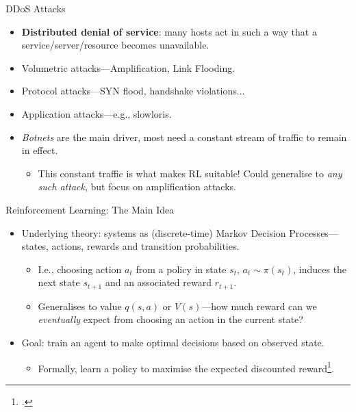 \documentclass[aspectratio=169,xcolor={dvipsnames}
,hide notes
]{beamer}
\begin{document}
\begin{frame}{DDoS Attacks}
\begin{itemize}
	\item \textbf{Distributed denial of service}: many hosts act in such a way that a service/server/resource becomes unavailable.
	\item \alert{Volumetric} attacks---Amplification, Link Flooding.
	\item \alert{Protocol} attacks---SYN flood, handshake violations...
	\item \alert{Application} attacks---e.g., slowloris.
	\item \emph{Botnets} are the main driver, most need a \alert{constant stream of traffic} to remain in effect.
	\begin{itemize}
		\item This constant traffic is what makes RL suitable! Could generalise to \emph{any such attack}, but focus on amplification attacks.
	\end{itemize}
\end{itemize}
\end{frame}

\begin{frame}{Reinforcement Learning: The Main Idea}
	\begin{itemize}
		\item Underlying theory: systems as (discrete-time) \alert{Markov Decision Processes}---states, actions, rewards and transition probabilities.
		\begin{itemize}
			\item I.e., choosing action $a_t$ from a policy in state $s_t$, $a_t \sim \pi(s_t)$, induces the next state $s_{t+1}$ and an associated reward $r_{t+1}$.
			\item Generalises to \alert{value} $q(s,a)$ or $V(s)$---how much reward can we \emph{eventually} expect from choosing an action in the current state?
		\end{itemize}
	
	\item Goal: train an agent to make optimal decisions based on observed state.
	\begin{itemize}
		\item Formally, learn a \alert{policy} to maximise the \alert{expected discounted reward}\footcite{RL2E}.
	\end{itemize}
	
	\end{itemize}
\end{frame}
\end{document}
